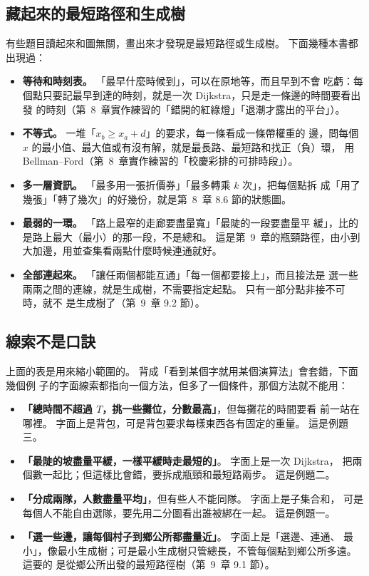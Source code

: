 \subsection{藏起來的最短路徑和生成樹}
\label{sec:cap-hidden}

有些題目讀起來和圖無關，畫出來才發現是最短路徑或生成樹。 下面幾種本書都出現過：

\begin{itemize}
\item \textbf{等待和時刻表。} 「最早什麼時候到」，可以在原地等，而且早到不會
吃虧：每個點只要記最早到達的時刻，就是一次 Dijkstra，只是走一條邊的時間要看出發
的時刻（第~8~章實作練習的「錯開的紅綠燈」「退潮才露出的平台」）。
\item \textbf{不等式。} 一堆「$x_b \ge x_a + d$」的要求，每一條看成一條帶權重的
邊，問每個 $x$ 的最小值、最大值或有沒有解，就是最長路、最短路和找正（負）環，
用 Bellman--Ford（第~8~章實作練習的「校慶彩排的可排時段」）。
\item \textbf{多一層資訊。} 「最多用一張折價券」「最多轉乘 $k$ 次」，把每個點拆
成「用了幾張」「轉了幾次」的好幾份，就是第~8~章 8.6 節的狀態圖。
\item \textbf{最弱的一環。} 「路上最窄的走廊要盡量寬」「最陡的一段要盡量平
緩」，比的是路上最大（最小）的那一段，不是總和。 這是第~9~章的瓶頸路徑，由小到大加邊，用並查集看兩點什麼時候連通就好。
\item \textbf{全部連起來。} 「讓任兩個都能互通」「每一個都要接上」，而且接法是
選一些兩兩之間的連線，就是生成樹，不需要指定起點。 只有一部分點非接不可時，就不
是生成樹了（第~9~章 9.2 節）。
\end{itemize}

\subsection{線索不是口訣}
\label{sec:cap-traps}

上面的表是用來縮小範圍的。 背成「看到某個字就用某個演算法」會套錯，下面幾個例
子的字面線索都指向一個方法，但多了一個條件，那個方法就不能用：

\begin{itemize}
\item \textbf{「總時間不超過 $T$，挑一些攤位，分數最高」}，但每攤花的時間要看
前一站在哪裡。 字面上是背包，可是背包要求每樣東西各有固定的重量。 這是例題三。
\item \textbf{「最陡的坡盡量平緩，一樣平緩時走最短的」}。 字面上是一次 Dijkstra，
把兩個數一起比；但這樣比會錯，要拆成瓶頸和最短路兩步。 這是例題二。
\item \textbf{「分成兩隊，人數盡量平均」}，但有些人不能同隊。 字面上是子集合和，
可是每個人不能自由選隊，要先用二分圖看出誰被綁在一起。 這是例題一。
\item \textbf{「選一些邊，讓每個村子到鄉公所都盡量近」}。 字面上是「選邊、連通、
最小」，像最小生成樹；可是最小生成樹只管總長，不管每個點到鄉公所多遠。 這要的
是從鄉公所出發的最短路徑樹（第~9~章 9.1 節）。
\end{itemize}

